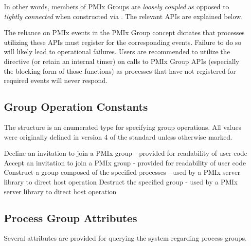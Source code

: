 In other words, members of \ac{PMIx} Groups are \emph{loosely coupled} as opposed to \emph{tightly connected} when constructed via . The relevant \acp{API} are explained below.

\adviceuserstart
The reliance on \ac{PMIx} events in the \ac{PMIx} Group concept dictates that processes utilizing these \acp{API} must register for the corresponding events. Failure to do so will likely lead to operational failures. Users are recommended to utilize the  directive (or retain an internal timer) on calls to \ac{PMIx} Group \acp{API} (especially the blocking form of those functions) as processes that have not registered for required events will never respond.
\adviceuserend


\subsection{Group Operation Constants}

The  structure is an enumerated type for specifying group operations. All values were originally defined in version 4 of the standard unless otherwise marked.

\begin{constantdesc}
%
Decline an invitation to join a \ac{PMIx} group - provided for readability of user code
%
Accept an invitation to join a \ac{PMIx} group - provided for readability of user code
%
Construct a group composed of the specified processes - used by a \ac{PMIx} server library to direct host operation
%
Destruct the specified group - used by a \ac{PMIx} server library to direct host operation
%
\end{constantdesc}


\subsection{Process Group Attributes}

Several attributes are provided for querying the system regarding process
groups.

%

